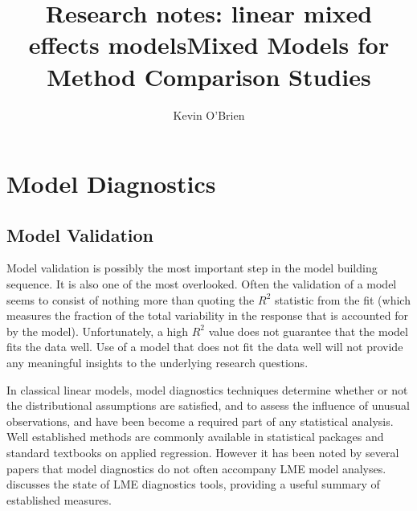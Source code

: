 \documentclass[12pt, a4paper]{report}
\title{Research notes: linear mixed effects models}
\author{ } \date{ }
\theoremstyle{plain}
\theoremstyle{definition}
\theoremstyle{remark}
\begin{document}
\author{Kevin O'Brien}
\title{Mixed Models for Method Comparison Studies}
\tableofcontents

\newpage

\chapter{Model Diagnostics}

\section{Model Validation}
Model validation is possibly the most important step in the model building sequence. It is also one of the most overlooked. Often the validation of a model seems to consist of nothing more than quoting the $R^2$ statistic from the fit (which measures the fraction of the total variability in the response that is accounted for by the model). Unfortunately, a high $R^2$ value does not guarantee that the model fits the data well. Use of a model that does not fit the data well will not provide any meaningful insights to the underlying research questions.


In classical linear models, model diagnostics techniques determine whether or not the distributional assumptions are satisfied, and to assess the influence of unusual observations, and have been become a required part of any statistical analysis. Well established methods are commonly available in statistical packages and standard textbooks on applied regression. However it has been noted by several papers that model diagnostics do not often accompany LME model analyses. \citet{schabenberger} discusses the state of LME diagnostics tools, providing a useful summary of established measures.
\end{document}
